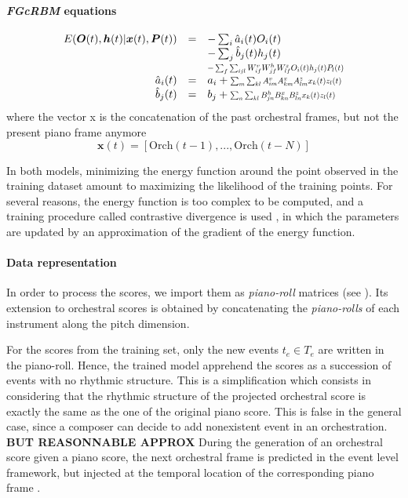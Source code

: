 \documentclass[twoside,twocolumn]{article}
\begin{document}
\paragraph{\textit{FGcRBM} equations}
\begin{equation}
\begin{array}{rcl}
E(\bm{O}(t),\bm{h}(t)|\bm{x}(t),\bm{P}(t)) & = & - \sum_{i} \hat{a}_{i}(t)O_{i}(t)\\ 
& & - \sum_{j} \hat{b}_{j}(t)h_{j}(t)\\
& & \scalebox{0.75}{$-\sum_{f}\sum_{ijl} W_{if}^{v} W_{jf}^{h} W_{lf}^{z} O_{i}(t) h_{j}(t) P_{l}(t)$}\\
\hat{a}_{i}(t) & = & a_{i} + \scalebox{0.75}{$\sum_{m} \sum_{kl}A_{im}^{v}A_{km}^{x}A_{lm}^{z}x_{k}(t)z_{l}(t)$}\\
\hat{b}_{j}(t) & = & b_{j} + \scalebox{0.75}{$\sum_{n} \sum_{kl}B_{jn}^{h}B_{kn}^{x}B_{ln}^{z}x_{k}(t)z_{l}(t)$}\\
\end{array}
\end{equation}
where the vector x is the concatenation of the past orchestral frames, but not the present piano frame anymore 
\[\bm{x}(t) = \left[\text{Orch}(t-1) , ... , \text{Orch}(t-N)\right]\]

In both models, minimizing the energy function around the point observed in the training dataset amount to maximizing the likelihood of the training points. For several reasons, the energy function is too complex to be computed, and a training procedure called contrastive divergence is used \cite{carreira2005contrastive}, in which the parameters are updated by an approximation of the gradient of the energy function.

\paragraph{Data representation}
In order to process the scores, we import them as \textit{piano-roll} matrices (see ). 
Its extension to orchestral scores is obtained by concatenating the \textit{piano-rolls} of each instrument along the pitch dimension.

For the scores from the training set, only the new events $t_e \in T_e$ are written in the piano-roll.
Hence, the trained model apprehend the scores as a succession of events with no rhythmic structure.
This is a simplification which consists in considering that the rhythmic structure of the projected orchestral score is exactly the same as the one of the original piano score. 
This is false in the general case, since a composer can decide to add nonexistent event in an orchestration.
\textbf{BUT REASONNABLE APPROX}
During the generation of an orchestral score given a piano score, the next orchestral frame is predicted in the event level framework, but injected at the temporal location of the corresponding piano frame .
\end{document}
